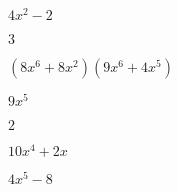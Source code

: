 \documentclass{article}
\begin{document}
\begin{multicols}{2}
$4x^2-2$\item $3$\item $(8x^{6}+8x^2)(9x^{6}+4x^{5})$\item $9x^{5}$\item $2$\item $10x^{4}+2x$\item $4x^{5}-8$\item
\end{multicols}
\end{document}
